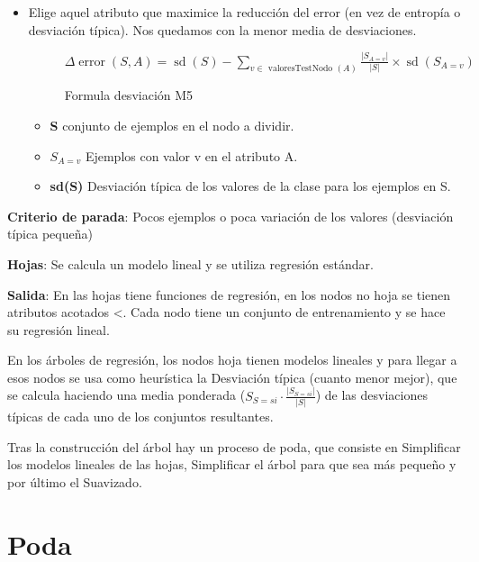 \documentclass[12pt, twoside, openright]{report} %
\begin{document}
\begin{itemize}
	\item Elige aquel atributo que maximice la reducción del error (en vez de
	      entropía o desviación típica). Nos quedamos con la menor media de
	      desviaciones.
	      \begin{figure}[H]
		      \(\Delta \operatorname{error}(S, A)=\operatorname{sd}(S)-\sum_{v \in \text { valoresTestNodo }(A)} \frac{\left|S_{A=v}\right|}{|S|} \times \operatorname{sd}\left(S_{A=v}\right)\)
		      \captionsetup{justification=centering}
		      \caption{Formula desviación M5}
	      \end{figure}

	      \begin{itemize}
		      \item \textbf{S} conjunto de ejemplos en el nodo a dividir.
		      \item \textbf{\(S_{A=v}\)} Ejemplos con valor v en el atributo A.
		      \item \textbf{sd(S)} Desviación típica de los valores de la clase para los
		            ejemplos en S.
	      \end{itemize}
\end{itemize}

\textbf{Criterio de parada}: Pocos ejemplos o poca variación de los
valores (desviación típica pequeña)

\textbf{Hojas}: Se calcula un modelo lineal y se utiliza regresión
estándar.

\textbf{Salida}: En las hojas tiene funciones de regresión, en los nodos
no hoja se tienen atributos acotados \textless. Cada nodo tiene un
conjunto de entrenamiento y se hace su regresión lineal.

En los árboles de regresión, los nodos hoja tienen modelos lineales y
para llegar a esos nodos se usa como heurística la Desviación típica
(cuanto menor mejor), que se calcula haciendo una media ponderada
(\(S_{S=si}\cdot\frac {|S_{S=si}|}{|S|}\)) de las desviaciones típicas
de cada uno de los conjuntos resultantes.

Tras la construcción del árbol hay un proceso de poda, que consiste en
Simplificar los modelos lineales de las hojas, Simplificar el árbol para
que sea más pequeño y por último el Suavizado.

\section{Poda}
\end{document}
